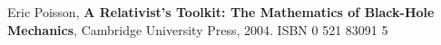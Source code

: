 \documentclass[10pt,a4paper,oneside]{article}
\theoremstyle{plain}
\theoremstyle{definition}
\theoremstyle{remark}
\numberwithin{equation}{section}
\begin{document}
%

%


%



%

%


%

%




%


\begin{thebibliography}{9}
Eric Poisson, 
\textbf{A Relativist's Toolkit: The Mathematics of Black-Hole Mechanics},
Cambridge University Press, 
2004.
ISBN 0 521 83091 5

\end{thebibliography}
\end{document}
